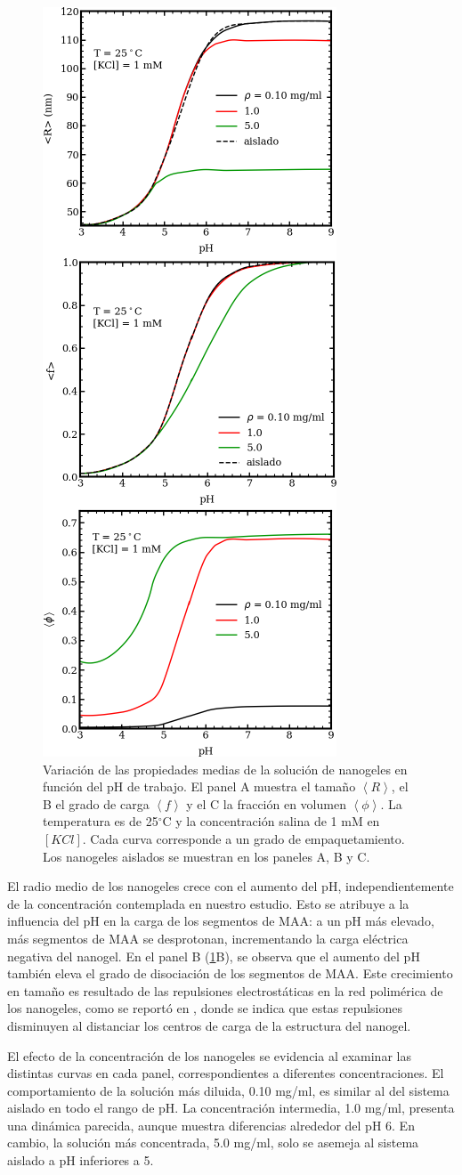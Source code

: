 	\begin{figure}[!htb]
		\centering
		\includegraphics[width=0.30\linewidth]{Figures/graph-mc/xvspH.pdf}
		\caption{Variaci\'on de las propiedades medias de la soluci\'on de nanogeles en funci\'on del pH de trabajo. El panel A muestra el tama\~no $\left<R\right>$, el B el grado de carga $\left<f\right>$ y el C la fracci\'on en volumen $\left<\phi\right>$. La temperatura es de 25$^\circ$C y la concentraci\'on salina de 1 mM en $[KCl]$. Cada curva corresponde a un grado de empaquetamiento. Los nanogeles aislados se muestran en los paneles A, B y C.}
		\label{fig:mc:xvspH}
	\end{figure}
	
	El radio medio de los nanogeles crece con el aumento del pH, independientemente de la concentraci\'on contemplada en nuestro estudio. Esto se atribuye a la influencia del pH en la carga de los segmentos de MAA: a un pH m\'as elevado, m\'as segmentos de MAA se desprotonan, incrementando la carga el\'ectrica negativa del nanogel. En el panel B (\ref{fig:mc:xvspH}B), se observa que el aumento del pH tambi\'en eleva el grado de disociaci\'on de los segmentos de MAA. Este crecimiento en tama\~no es resultado de las repulsiones electrost\'aticas en la red polim\'erica de los nanogeles, como se report\'o en \cite{perez2021thermodynamic}, donde se indica que estas repulsiones disminuyen al distanciar los centros de carga de la estructura del nanogel.
	
	El efecto de la concentraci\'on de los nanogeles se evidencia al examinar las distintas curvas en cada panel, correspondientes a diferentes concentraciones. El comportamiento de la soluci\'on m\'as diluida, 0.10 mg/ml, es similar al del sistema aislado en todo el rango de pH. La concentraci\'on intermedia, 1.0 mg/ml, presenta una din\'amica parecida, aunque muestra diferencias alrededor del pH 6. En cambio, la soluci\'on m\'as concentrada, 5.0 mg/ml, solo se asemeja al sistema aislado a pH inferiores a 5.
	
